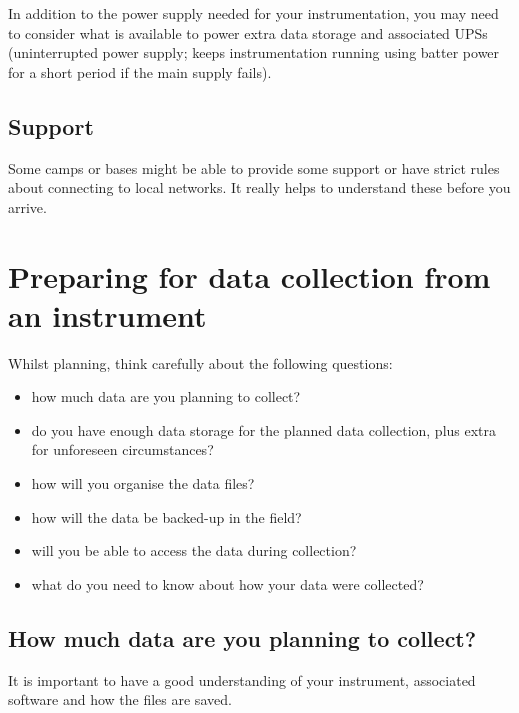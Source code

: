 \documentclass[a4paper,oneside]{report}
\providecommand{\tightlist}{%
  \setlength{\itemsep}{0pt}\setlength{\parskip}{0pt}}
\begin{document}
In addition to the power supply needed for your instrumentation, you may
need to consider what is available to power extra data storage and
associated UPSs (uninterrupted power supply; keeps instrumentation
running using batter power for a short period if the main supply fails).

\hypertarget{support}{%
\subsection{Support}\label{support}}

Some camps or bases might be able to provide some support or have strict
rules about connecting to local networks. It really helps to understand
these before you arrive.

\hypertarget{preparing-for-data-collection-from-an-instrument}{%
\section{Preparing for data collection from an
instrument}\label{preparing-for-data-collection-from-an-instrument}}

Whilst planning, think carefully about the following questions:

\begin{itemize}
\tightlist
\item
  how much data are you planning to collect?
\item
  do you have enough data storage for the planned data collection, plus
  extra for unforeseen circumstances?
\item
  how will you organise the data files?
\item
  how will the data be backed-up in the field?
\item
  will you be able to access the data during collection?
\item
  what do you need to know about how your data were collected?
\end{itemize}

\hypertarget{how-much-data-are-you-planning-to-collect}{%
\subsection{How much data are you planning to
collect?}\label{how-much-data-are-you-planning-to-collect}}

It is important to have a good understanding of your instrument,
associated software and how the files are saved.
\end{document}
